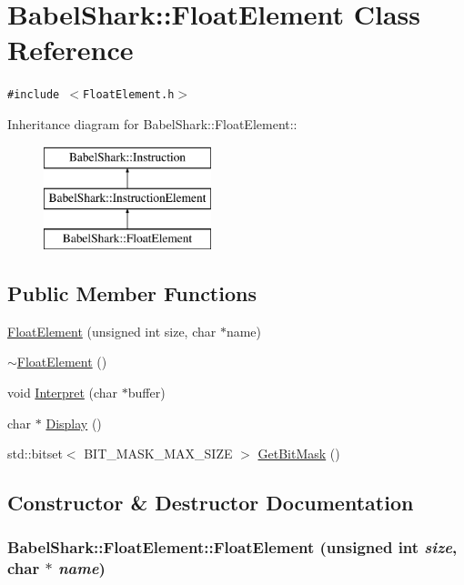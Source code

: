 \hypertarget{class_babel_shark_1_1_float_element}{
\section{BabelShark::FloatElement Class Reference}
\label{class_babel_shark_1_1_float_element}
}
{\tt \#include $<$FloatElement.h$>$}

Inheritance diagram for BabelShark::FloatElement::\begin{figure}[H]
\begin{center}
\leavevmode
\includegraphics[height=3cm]{class_babel_shark_1_1_float_element}
\end{center}
\end{figure}
\subsection*{Public Member Functions}
\begin{CompactItemize}
\item 
\hyperlink{class_babel_shark_1_1_float_element_9ee46b35dc12b42269f148747601449b}{FloatElement} (unsigned int size, char $\ast$name)
\item 
\hyperlink{class_babel_shark_1_1_float_element_147f0c9260a5470c27249effcc0e3211}{$\sim$FloatElement} ()
\item 
void \hyperlink{class_babel_shark_1_1_float_element_8431ada746a028580cccdadc83538793}{Interpret} (char $\ast$buffer)
\item 
char $\ast$ \hyperlink{class_babel_shark_1_1_float_element_7c8e429b760e1e24985e3046d4640674}{Display} ()
\item 
std::bitset$<$ BIT\_\-MASK\_\-MAX\_\-SIZE $>$ \hyperlink{class_babel_shark_1_1_float_element_9049dc22f918d2c3aebf630c5ece954b}{GetBitMask} ()
\end{CompactItemize}


\subsection{Constructor \& Destructor Documentation}
\hypertarget{class_babel_shark_1_1_float_element_9ee46b35dc12b42269f148747601449b}{
\subsubsection[{FloatElement}]{\setlength{\rightskip}{0pt plus 5cm}BabelShark::FloatElement::FloatElement (unsigned int {\em size}, \/  char $\ast$ {\em name})}}
\label{class_babel_shark_1_1_float_element_9ee46b35dc12b42269f148747601449b}


